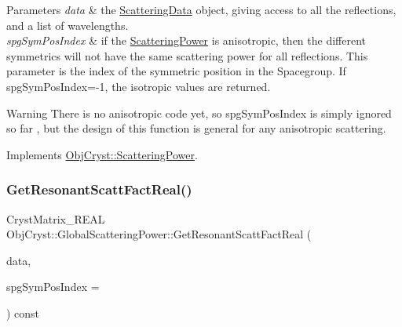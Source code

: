 \begin{DoxyParams}{Parameters}
{\em data} & the \mbox{\hyperlink{class_obj_cryst_1_1_scattering_data}{Scattering\+Data}} object, giving access to all the reflections, and a list of wavelengths. \\
\hline
{\em spg\+Sym\+Pos\+Index} & if the \mbox{\hyperlink{class_obj_cryst_1_1_scattering_power}{Scattering\+Power}} is anisotropic, then the different symmetrics will not have the same scattering power for all reflections. This parameter is the index of the symmetric position in the Spacegroup. If spg\+Sym\+Pos\+Index=-\/1, the isotropic values are returned. \\
\hline
\end{DoxyParams}
\begin{DoxyWarning}{Warning}
There is no anisotropic code yet, so spg\+Sym\+Pos\+Index is simply ignored so far , but the design of this function is general for any anisotropic scattering. 
\end{DoxyWarning}


Implements \mbox{\hyperlink{class_obj_cryst_1_1_scattering_power_a9bc5d86bf76116f645b43d46f2a9771c}{Obj\+Cryst\+::\+Scattering\+Power}}.

\mbox{\label{class_obj_cryst_1_1_global_scattering_power_a9dd42d2bf3990261d0ba88a8478dd45a}} 
\subsubsection{\texorpdfstring{GetResonantScattFactReal()}{GetResonantScattFactReal()}}
{\footnotesize\ttfamily Cryst\+Matrix\+\_\+\+R\+E\+AL Obj\+Cryst\+::\+Global\+Scattering\+Power\+::\+Get\+Resonant\+Scatt\+Fact\+Real (\begin{DoxyParamCaption}\item[{const \mbox{\hyperlink{class_obj_cryst_1_1_scattering_data}{Scattering\+Data}} \&}]{data,  }\item[{const int}]{spg\+Sym\+Pos\+Index = {} }\end{DoxyParamCaption}) const\hspace{0.3cm}{\ttfamily [virtual]}}



